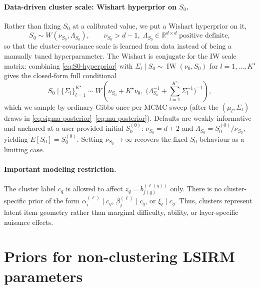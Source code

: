 \documentclass[11pt]{article}
\newcommand{\R}{\mathbb R}
\DeclareMathOperator{\IW}{IW}
\begin{document}
\paragraph{Data-driven cluster scale: Wishart hyperprior on $S_0$.}
Rather than fixing $S_0$ at a calibrated value, we put a Wishart hyperprior on it,
\begin{equation}
    S_0\sim W(\nu_{S_0},\Lambda_{S_0}),
    \qquad \nu_{S_0}>d-1,\;\Lambda_{S_0}\in\R^{d\times d}\;\text{positive definite},
    \label{eq:S0-hyperprior}
\end{equation}
so that the cluster-covariance scale is learned from data instead of being a
manually tuned hyperparameter.  The Wishart is conjugate for the IW scale
matrix: combining \eqref{eq:S0-hyperprior} with
$\Sigma_l\mid S_0\sim\IW(\nu_0,S_0)$ for $l=1,\dots,K^\star$ gives the
closed-form full conditional
\begin{equation}
    S_0\mid\{\Sigma_l\}_{l=1}^{K^\star}
    \sim
    W\!\left(
    \nu_{S_0}+K^\star\nu_0,\;
    \bigl(\Lambda_{S_0}^{-1}+\sum_{l=1}^{K^\star}\Sigma_l^{-1}\bigr)^{-1}
    \right),
    \label{eq:S0-update}
\end{equation}
which we sample by ordinary Gibbs once per MCMC sweep (after the
$(\mu_l,\Sigma_l)$ draws in \eqref{eq:sigma-posterior}--\eqref{eq:mu-posterior}).
Defaults are weakly informative and anchored at a user-provided initial
$S_0^{(0)}$:
$\nu_{S_0}=d+2$ and $\Lambda_{S_0}=S_0^{(0)}/\nu_{S_0}$, yielding
$E[S_0]=S_0^{(0)}$.  Setting $\nu_{S_0}\to\infty$ recovers the fixed-$S_0$
behaviour as a limiting case.

\paragraph{Important modeling restriction.}
The cluster label $c_q$ is allowed to affect $z_q=b_{j(q)}^{(\ell(q))}$ only.
There is no cluster-specific prior of the form
$\alpha_i^{(\ell)}\mid c_q$, $\beta_j^{(\ell)}\mid c_q$, or
$\xi_\ell\mid c_q$.  Thus, clusters represent latent item geometry rather than
marginal difficulty, ability, or layer-specific nuisance effects.

\section{Priors for non-clustering LSIRM parameters}
\end{document}
